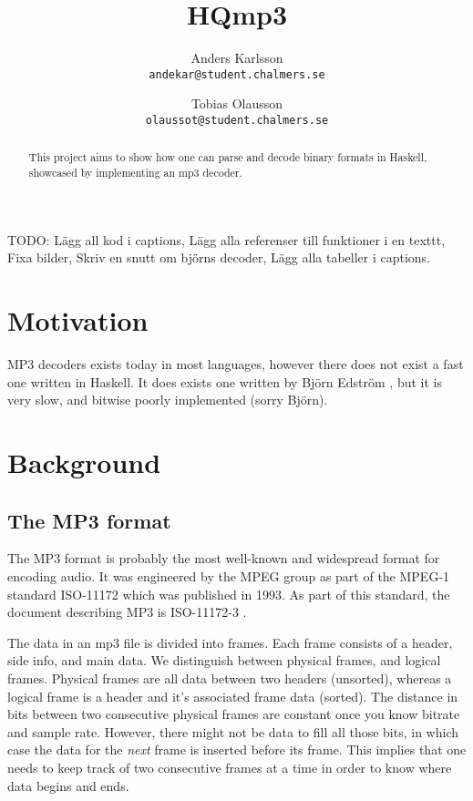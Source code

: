 \documentclass[a4paper,12pt]{article}
\title{HQmp3}
\author{Anders Karlsson \\ \small{\texttt{andekar@student.chalmers.se}}
   \and Tobias Olausson \\ \small{\texttt{olaussot@student.chalmers.se}}
}
\begin{document}
\maketitle

\begin{abstract}
    This project aims to show how one can parse and decode binary formats in
    Haskell, showcased by implementing an mp3 decoder.
\end{abstract}

\tableofcontents


TODO: Lägg all kod i captions,
      Lägg alla referenser till funktioner i en texttt,
      Fixa bilder,
      Skriv en snutt om björns decoder,
      Lägg alla tabeller i captions.

\section{Motivation}
    MP3 decoders exists today in most languages, however there does not exist
    a fast one written in Haskell. It does exists one written by Björn Edström
    \cite{bjorn}, but it is very slow, and bitwise poorly implemented (sorry
    Björn).

\section{Background}
    \subsection{The MP3 format}
       The MP3 format is probably the most well-known and widespread format for
       encoding audio. It was engineered by the MPEG group as part of the MPEG-1
       standard ISO-11172 which was published in 1993. As part of this standard,
       the document describing MP3 is ISO-11172-3 \cite{wikimp3,wikimpeg1}.

       The data in an mp3 file is divided into frames. Each frame consists of
       a header, side info, and main data. We distinguish between physical
       frames, and logical frames. Physical frames are all data between two
       headers (unsorted), whereas a logical frame is a header and it's
       associated frame data (sorted). The distance in bits between two
       consecutive physical frames are constant once you know bitrate and sample
       rate. However, there might not be data to fill all those bits, in which
       case the data for the \textit{next} frame is inserted before its frame.
       This implies that one needs to keep track of two consecutive frames at a 
       time in order to know where data begins and ends.
\end{document}
